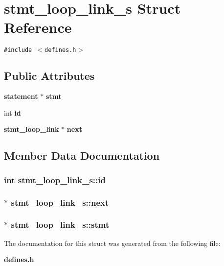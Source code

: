 \section{stmt\_\-loop\_\-link\_\-s Struct Reference}
\label{structstmt__loop__link__s}
{\tt \#include $<$defines.h$>$}

\subsection*{Public Attributes}
\begin{CompactItemize}
\item 
{\bf statement} $\ast$ {\bf stmt}
\item 
int {\bf id}
\item 
{\bf stmt\_\-loop\_\-link} $\ast$ {\bf next}
\end{CompactItemize}


\subsection{Member Data Documentation}
\subsubsection{\setlength{\rightskip}{0pt plus 5cm}int {\bf stmt\_\-loop\_\-link\_\-s::id}}\label{structstmt__loop__link__s_o1}


\subsubsection{$\ast$ {\bf stmt\_\-loop\_\-link\_\-s::next}}\label{structstmt__loop__link__s_o2}


\subsubsection{$\ast$ {\bf stmt\_\-loop\_\-link\_\-s::stmt}}\label{structstmt__loop__link__s_o0}




The documentation for this struct was generated from the following file:\begin{CompactItemize}
\item 
{\bf defines.h}\end{CompactItemize}
